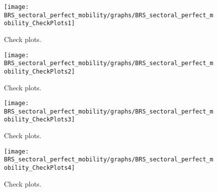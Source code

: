  
\begin{figure}[H]
\centering 
\texttt{[image: BRS\_sectoral\_perfect\_mobility/graphs/BRS\_sectoral\_perfect\_mobility\_CheckPlots1]}
\caption{Check plots.}\label{Fig:CheckPlots:1}
\end{figure}
 
\begin{figure}[H]
\centering 
\texttt{[image: BRS\_sectoral\_perfect\_mobility/graphs/BRS\_sectoral\_perfect\_mobility\_CheckPlots2]}
\caption{Check plots.}\label{Fig:CheckPlots:2}
\end{figure}
 
\begin{figure}[H]
\centering 
\texttt{[image: BRS\_sectoral\_perfect\_mobility/graphs/BRS\_sectoral\_perfect\_mobility\_CheckPlots3]}
\caption{Check plots.}\label{Fig:CheckPlots:3}
\end{figure}
 
\begin{figure}[H]
\centering 
\texttt{[image: BRS\_sectoral\_perfect\_mobility/graphs/BRS\_sectoral\_perfect\_mobility\_CheckPlots4]}
\caption{Check plots.}\label{Fig:CheckPlots:4}
\end{figure}
 
